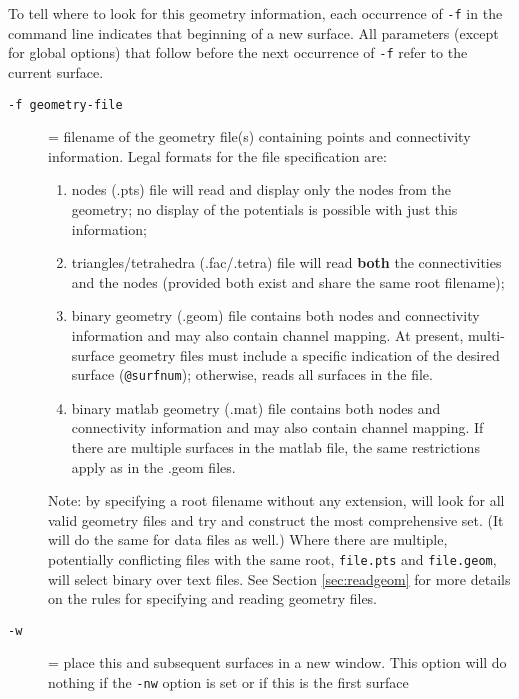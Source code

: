 To tell \map{} where to look for this geometry information, 
each occurrence of \texttt{-f} in the command line indicates that 
beginning of a new surface.  All parameters (except for global options)
that follow before the 
next occurrence of \texttt{-f} refer to the current surface.
%
\begin{description}
  \item[{\tt -f geometry-file} ]
    = filename of the geometry file(s) containing points and
    connectivity information.   Legal formats for the file specification 
    are: 
    \begin{enumerate}
      \item nodes (.pts) file will read and display only the 
        nodes from the geometry; no display of the potentials is 
        possible with just this information;
        
      \item triangles/tetrahedra (.fac/.tetra) file will read 
        \textbf{both} the connectivities and the nodes (provided
        both exist and share the same root filename);
        
      \item binary geometry (.geom) file contains both nodes and 
        connectivity information and may also contain channel
        mapping.  At present, multi-surface geometry files must
        include a specific indication of the desired surface
        (\texttt{@surfnum}); otherwise, \map{} reads all surfaces
        in the file.  
      \item binary matlab geometry (.mat) file contains both nodes and 
        connectivity information and may also contain channel
        mapping.  If there are multiple surfaces in the matlab
        file, the same restrictions apply as in the .geom files.
    \end{enumerate}
    Note: by specifying a root filename without any extension, \map{} will
    look for all valid geometry files and try and construct the most
    comprehensive set.  (It will do the same for data files as well.)
    Where there are multiple, potentially
    conflicting files with the same root, \eg{} \texttt{file.pts} and
    \texttt{file.geom}, \map{} will select binary over text files.  
    See Section \ref{sec:readgeom} for more details on the rules for
    specifying and reading geometry files.  
    
  \item[{\tt-w}] = place this and subsequent surfaces in a new window.
    This option will do nothing if the \texttt{-nw} option is set or if
    this is the first surface
    

\end{description}
